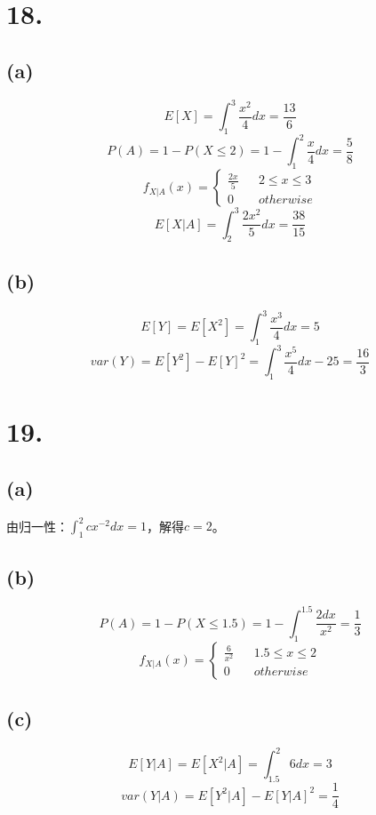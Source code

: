 \documentclass[UTF8]{report}
\begin{document}
    \section*{18.}
        \subsection*{(a)}
            $$E[X] = \int_{1}^{3}\frac{x^2}{4}dx = \frac{13}{6}$$
            $$P(A) = 1 - P(X \leq 2) = 1 - \int_{1}^{2}\frac{x}{4}dx = \frac{5}{8}$$
            $$f_{X|A}(x) = \left\{
                \begin{array}{lcr}
                    \frac{2x}{5} & & 2 \leq x \leq 3\\
                    0 & & otherwise
                \end{array}
            \right.$$
            $$E[X|A] = \int_{2}^{3}\frac{2x^2}{5}dx = \frac{38}{15}$$
        \subsection*{(b)}
            $$E[Y] = E[X^2] = \int_{1}^{3}\frac{x^3}{4}dx = 5$$
            $$var(Y) = E[Y^2] - E[Y]^2 = \int_{1}^{3}\frac{x^5}{4}dx - 25 = \frac{16}{3}$$
    \section*{19.}
        \subsection*{(a)}
            由归一性：$\int_{1}^{2}cx^{-2}dx = 1$，解得$c = 2$。
        \subsection*{(b)}
            $$P(A) = 1 - P(X \leq 1.5) = 1 - \int_{1}^{1.5}\frac{2dx}{x^2} = \frac{1}{3}$$
            $$f_{X|A}(x) = \left\{
                \begin{array}{lcr}
                    \frac{6}{x^2} & & 1.5 \leq x \leq 2\\
                    0 & & otherwise
                \end{array}
            \right.$$
        \subsection*{(c)}
            $$E[Y|A] = E[X^2|A] = \int_{1.5}^{2}6dx = 3$$
            $$var(Y|A) = E[Y^2|A] - E[Y|A]^2 = \frac{1}{4}$$
\end{document}

